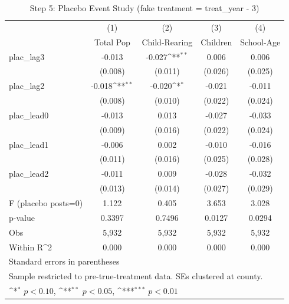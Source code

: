 \begin{table}[htbp]\centering
\def\sym#1{\ifmmode^{#1}\else\(^{#1}\)\fi}
\caption{Step 5: Placebo Event Study (fake treatment = treat\_year - 3)}
\begin{tabular}{l*{4}{c}}
\hline\hline
            &\multicolumn{1}{c}{(1)}&\multicolumn{1}{c}{(2)}&\multicolumn{1}{c}{(3)}&\multicolumn{1}{c}{(4)}\\
            &\multicolumn{1}{c}{Total Pop}&\multicolumn{1}{c}{Child-Rearing}&\multicolumn{1}{c}{Children}&\multicolumn{1}{c}{School-Age}\\
\hline
plac\_lag3   &      -0.013         &      -0.027\sym{**} &       0.006         &       0.006         \\
            &     (0.008)         &     (0.011)         &     (0.026)         &     (0.025)         \\
[1em]
plac\_lag2   &      -0.018\sym{**} &      -0.020\sym{*}  &      -0.021         &      -0.011         \\
            &     (0.008)         &     (0.010)         &     (0.022)         &     (0.024)         \\
[1em]
plac\_lead0  &      -0.013         &       0.013         &      -0.027         &      -0.033         \\
            &     (0.009)         &     (0.016)         &     (0.022)         &     (0.024)         \\
[1em]
plac\_lead1  &      -0.006         &       0.002         &      -0.010         &      -0.016         \\
            &     (0.011)         &     (0.016)         &     (0.025)         &     (0.028)         \\
[1em]
plac\_lead2  &      -0.011         &       0.009         &      -0.028         &      -0.032         \\
            &     (0.013)         &     (0.014)         &     (0.027)         &     (0.029)         \\
\hline
F (placebo posts=0)&       1.122         &       0.405         &       3.653         &       3.028         \\
p-value     &      0.3397         &      0.7496         &      0.0127         &      0.0294         \\
Obs         &       5,932         &       5,932         &       5,932         &       5,932         \\
Within R^2  &       0.000         &       0.000         &       0.000         &       0.000         \\
\hline\hline
\multicolumn{5}{l}{\footnotesize Standard errors in parentheses}\\
\multicolumn{5}{l}{\footnotesize Sample restricted to pre-true-treatment data.  SEs clustered at county.}\\
\multicolumn{5}{l}{\footnotesize \sym{*} \(p<0.10\), \sym{**} \(p<0.05\), \sym{***} \(p<0.01\)}\\
\end{tabular}
\end{table}
